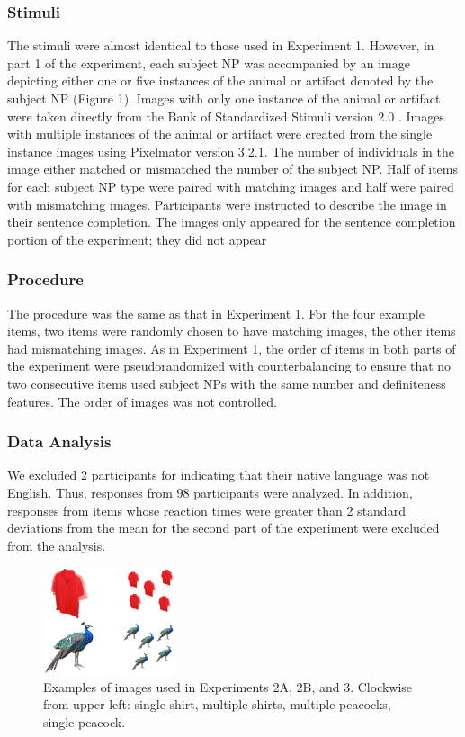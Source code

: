 \documentclass[10pt,letterpaper]{article}
\begin{document}
\subsubsection{Stimuli} \quad The stimuli were almost identical to those used in Experiment 1. However, in part 1 of the experiment, each subject NP was accompanied by an image depicting either one or five instances of the animal or artifact denoted by the subject NP (Figure 1). Images with only one instance of the animal or artifact were taken directly from the Bank of Standardized Stimuli version 2.0 \cite{Brodeur:2014}. Images with multiple instances of the animal or artifact were created from the single instance images using Pixelmator version 3.2.1. The number of individuals in the image either matched or mismatched the number of the subject NP. Half of items for each subject NP type were paired with matching images and half were paired with mismatching images. Participants were instructed to describe the image in their sentence completion. The images only appeared for the sentence completion portion of the experiment; they did not appear 

\subsubsection{Procedure} \quad The procedure was the same as that in Experiment 1. For the four example items, two items were randomly chosen to have matching images, the other items had mismatching images. As in Experiment 1, the order of items in both parts of the experiment were pseudorandomized with counterbalancing to ensure that no two consecutive items used subject NPs with the same number and definiteness features. The order of images was not controlled.

\subsubsection{Data Analysis} \quad We excluded 2 participants for indicating that their native language was not English. Thus, responses from 98 participants were analyzed. In addition, responses from items whose reaction times were greater than 2 standard deviations from the mean for the second part of the experiment were excluded from the analysis.

\begin{figure}[t]
\begin{center}
\includegraphics[width=0.35\textwidth]{figures/stimuli.jpg}
\end{center}
\caption{Examples of images used in Experiments 2A, 2B, and 3. Clockwise from upper left: single shirt, multiple shirts, multiple peacocks, single peacock.} 
\label{sample-figure}
\end{figure}
\end{document}
